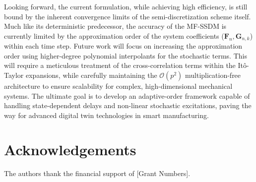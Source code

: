 \documentclass[preprint,12pt]{elsarticle}
\begin{document}
Looking forward, the current formulation, while achieving high efficiency, is still bound by the inherent convergence limits of the semi-discretization scheme itself. Much like its deterministic predecessor, the accuracy of the MF-SSDM is currently limited by the approximation order of the system coefficients ($\mathbf{F}_n, \mathbf{G}_{n,k}$) within each time step. Future work will focus on increasing the approximation order using higher-degree polynomial interpolants for the stochastic terms. This will require a meticulous treatment of the cross-correlation terms within the It\^o-Taylor expansions, while carefully maintaining the $\mathcal{O}(p^2)$ multiplication-free architecture to ensure scalability for complex, high-dimensional mechanical systems. The ultimate goal is to develop an adaptive-order framework capable of handling state-dependent delays and non-linear stochastic excitations, paving the way for advanced digital twin technologies in smart manufacturing.

\section*{Acknowledgements}
The authors thank the financial support of [Grant Numbers].




\nocite{*}
\end{document}
